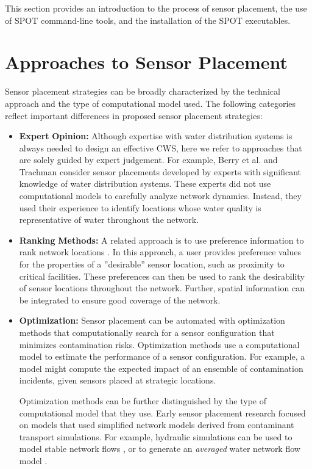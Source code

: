This section provides an introduction to the process of sensor placement, the use of SPOT command-\/line tools, and the installation of the SPOT executables.

\section{Approaches to Sensor Placement}\label{example_gStarted1}

Sensor placement strategies can be broadly characterized by the technical approach and the type of computational model used. The following categories reflect important differences in proposed sensor placement strategies:
\begin{itemize}

\item {\bfseries Expert} {\bfseries Opinion:} Although expertise with water distribution systems is always needed to design an effective CWS, here we refer to approaches that are solely guided by expert judgement. For example, Berry et al. \cite{BerHarPhiUbeWal05} and Trachman \cite{Tra06} consider sensor placements developed by experts with significant knowledge of water distribution systems. These experts did not use computational models to carefully analyze network dynamics. Instead, they used their experience to identify locations whose water quality is representative of water throughout the network.

\item {\bfseries Ranking} {\bfseries Methods:} A related approach is to use preference information to rank network locations 
\cite{BahSamGraAmsPic03,Chastain04}. In this approach, a user provides preference values for the properties of a ''desirable'' sensor location, such as proximity to critical facilities. These preferences can then be used to rank the desirability of sensor locations throughout the network. Further, spatial information can be integrated to ensure good coverage of the network.

\item {\bfseries Optimization:} Sensor placement can be automated with optimization methods that computationally search for a sensor configuration that minimizes contamination risks. Optimization methods use a computational model to estimate the performance of a sensor configuration. For example, a model might compute the expected impact of an ensemble of contamination incidents, given sensors placed at strategic locations.

Optimization methods can be further distinguished by the type of computational model that they use. Early sensor placement research focused on models that used simplified network models derived from contaminant transport simulations. For example, hydraulic simulations can be used to model stable network flows 
\cite{BerFleHarPhiWat05}, or to generate an {\itshape averaged\/} water network flow model \cite{OstSal04}.


\end{itemize}
